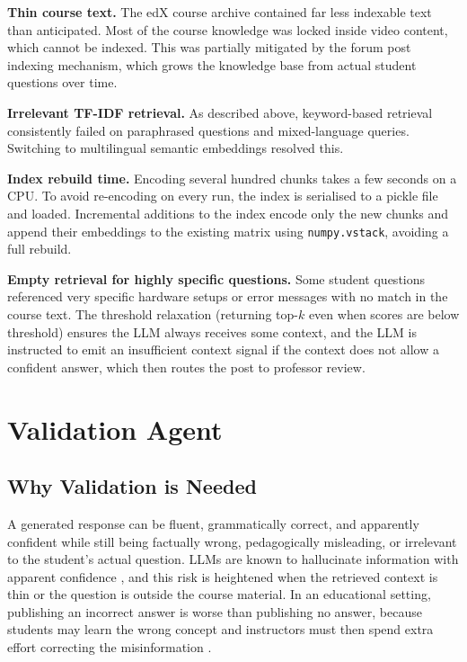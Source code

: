 \documentclass[12pt, a4paper]{article}
\begin{document}
\textbf{Thin course text.} The edX course archive contained far less indexable text than anticipated. Most of the course knowledge was locked inside video content, which cannot be indexed. This was partially mitigated by the forum post indexing mechanism, which grows the knowledge base from actual student questions over time.

\textbf{Irrelevant TF-IDF retrieval.} As described above, keyword-based retrieval consistently failed on paraphrased questions and mixed-language queries. Switching to multilingual semantic embeddings resolved this.

\textbf{Index rebuild time.} Encoding several hundred chunks takes a few seconds on a CPU. To avoid re-encoding on every run, the index is serialised to a pickle file and loaded. Incremental additions to the index encode only the new chunks and append their embeddings to the existing matrix using \texttt{numpy.vstack}, avoiding a full rebuild.

\textbf{Empty retrieval for highly specific questions.} Some student questions referenced very specific hardware setups or error messages with no match in the course text. The threshold relaxation (returning top-$k$ even when scores are below threshold) ensures the LLM always receives some context, and the LLM is instructed to emit an insufficient context signal if the context does not allow a confident answer, which then routes the post to professor review.

\section{Validation Agent}

\subsection{Why Validation is Needed}

A generated response can be fluent, grammatically correct, and apparently confident while still being factually wrong, pedagogically misleading, or irrelevant to the student's actual question. LLMs are known to hallucinate information with apparent confidence \cite{ji2023hallucination}, and this risk is heightened when the retrieved context is thin or the question is outside the course material. In an educational setting, publishing an incorrect answer is worse than publishing no answer, because students may learn the wrong concept and instructors must then spend extra effort correcting the misinformation \cite{kasneci2023chatgpt}.
\end{document}
